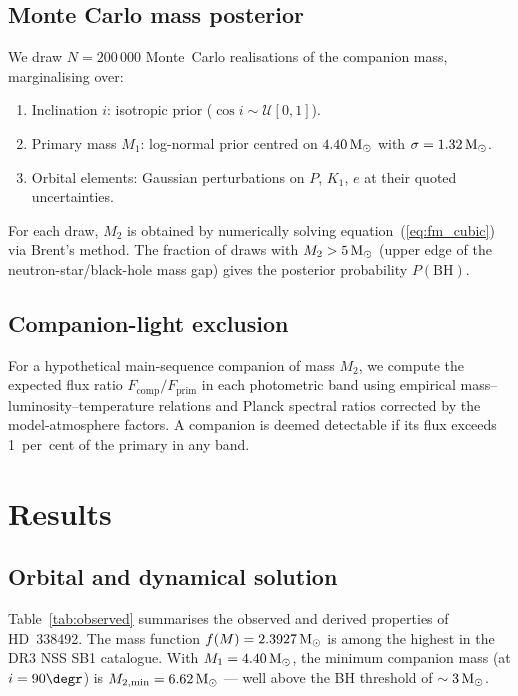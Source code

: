 \documentclass[usenatbib,fleqn]{mnras}
\newcommand{\Msun}{{\rm M}_\odot}
\newcommand{\fmass}{f(M)}
\begin{document}
\subsection{Monte Carlo mass posterior}
\label{sec:methods:mc}

We draw $N = 200\,000$ Monte~Carlo realisations of the companion
mass, marginalising over:
\begin{enumerate}
\item Inclination $i$: isotropic prior ($\cos i \sim \mathcal{U}[0,1]$).
\item Primary mass $M_1$: log-normal prior centred on $4.40\,\Msun$
  with $\sigma = 1.32\,\Msun$.
\item Orbital elements: Gaussian perturbations on $P$, $K_1$, $e$
  at their quoted uncertainties.
\end{enumerate}
For each draw, $M_2$ is obtained by numerically solving
equation~(\ref{eq:fm_cubic}) via Brent's method.  The fraction of
draws with $M_2 > 5\,\Msun$ (upper edge of the neutron-star/black-hole
mass gap) gives the posterior probability $P(\text{BH})$.

\subsection{Companion-light exclusion}
\label{sec:methods:companion}

For a hypothetical main-sequence companion of mass $M_2$, we compute
the expected flux ratio $F_\mathrm{comp}/F_\mathrm{prim}$ in each
photometric band using empirical mass--luminosity--temperature
relations \citep{Eker2018} and Planck spectral ratios corrected by
the \citet{CastelliKurucz2004} model-atmosphere factors.  A companion
is deemed detectable if its flux exceeds 1~per~cent of the primary
in any band.

\section{Results}
\label{sec:results}

\subsection{Orbital and dynamical solution}
\label{sec:results:orbit}

Table~\ref{tab:observed} summarises the observed and derived
properties of HD~338492.  The mass function
$\fmass = 2.3927\,\Msun$ is among the highest in the DR3 NSS SB1
catalogue.  With $M_1 = 4.40\,\Msun$, the minimum companion mass
(at $i = 90\degr$) is $M_{2,\min} = 6.62\,\Msun$ --- well above
the BH threshold of $\sim 3\,\Msun$.
\end{document}
